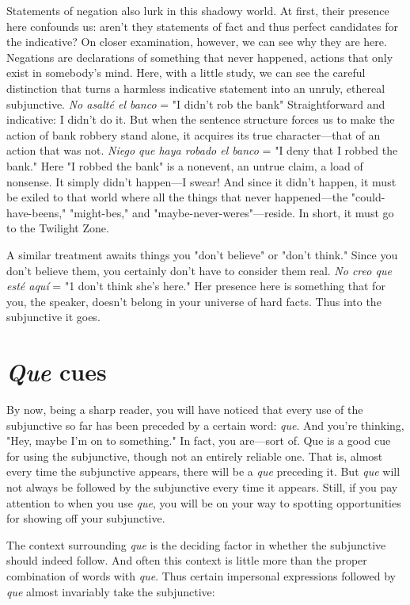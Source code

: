 \documentclass[14pt,a4paper,oneside]{memoir}
\begin{document}
Statements of negation also lurk in this shadowy world. At
first, their presence here confounds us: aren't they statements of fact
and thus perfect candidates for the indicative? On closer examination,
however, we can see why they are here. Negations are declarations of
something that never happened, actions that only exist in somebody's
mind. Here, with a little study, we can see the careful distinction that
turns a harmless indicative statement into an unruly, ethereal subjunctive. \emph{No asalté el banco} = "I didn't rob the bank" Straightforward and
indicative: I didn't do it. But when the sentence structure forces us to
make the action of bank robbery stand alone, it acquires its true character---that of an action that was not. \emph{Niego que haya robado el banco}
= "I deny that I robbed the bank." Here "I robbed the bank" is a nonevent, an untrue claim, a load of nonsense. It simply didn't happen---I swear! And since it didn't happen, it must be exiled to that world
where all the things that never happened---the "could-have-beens,"
"might-bes," and "maybe-never-weres"---reside. In short, it must go
to the Twilight Zone.

A similar treatment awaits things you "don't believe" or
"don't think." Since you don't believe them, you certainly don't have
to consider them real. \emph{No creo que esté aquí} = "1 don't think she's
here." Her presence here is something that for you, the speaker,
doesn't belong in your universe of hard facts. Thus into the subjunctive
it goes.

\section{\emph{Que} cues}

By now, being a sharp reader, you will have noticed that every
use of the subjunctive so far has been preceded by a certain word: \emph{que}.
And you're thinking, "Hey, maybe I'm on to something." In fact, you
are---sort of. Que is a good cue for using the subjunctive, though not
an entirely reliable one. That is, almost every time the subjunctive
appears, there will be a \emph{que} preceding it. But \emph{que} will not always be
followed by the subjunctive every time it appears. Still, if you pay
attention to when you use \emph{que}, you will be on your way to spotting
opportunities for showing off your subjunctive.

The context surrounding \emph{que} is the deciding factor in whether
the subjunctive should indeed follow. And often this context is little
more than the proper combination of words with \emph{que}. Thus certain
impersonal expressions followed by \emph{que} almost invariably take the
subjunctive:
\end{document}
